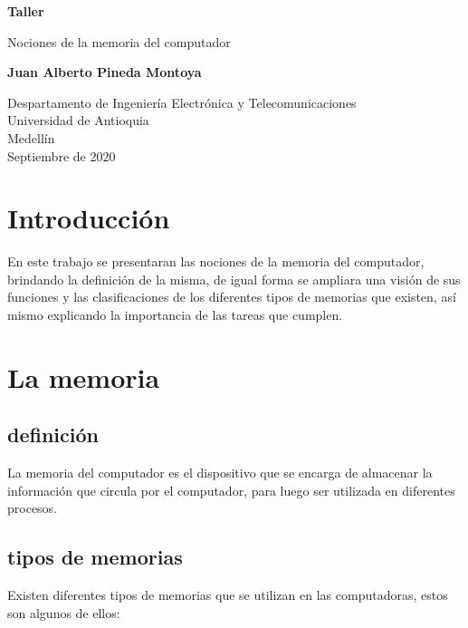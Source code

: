 \documentclass{article}
\begin{document}
\begin{titlepage}
    \begin{center}
        \vspace*{1cm}
            
        \Huge
        \textbf{Taller}
            
        \vspace{0.5cm}
        \LARGE
        Nociones de la memoria del computador
            
        \vspace{1.5cm}
            
        \textbf{Juan Alberto Pineda Montoya}
            
        \vfill
            
        \vspace{0.8cm}
            
        \Large
        Despartamento de Ingeniería Electrónica y Telecomunicaciones\\
        Universidad de Antioquia\\
        Medellín\\
        Septiembre de 2020
            
    \end{center}
\end{titlepage}

\tableofcontents

\section{Introducción}
En este trabajo se presentaran las nociones de la memoria del computador, brindando la definición de la misma, de igual forma se ampliara una visión de sus funciones y las clasificaciones de los diferentes tipos de memorias que existen, así mismo explicando la importancia de las tareas que cumplen.

\section{La memoria} \label{contenido}
\subsection{definición}
La memoria del computador es el dispositivo que se encarga de almacenar la información que circula por el computador, para luego ser utilizada en diferentes procesos.\cite{Augusto}
\subsection{tipos de memorias}
 Existen diferentes tipos de memorias que se utilizan en las computadoras, estos son algunos de ellos:
\end{document}
